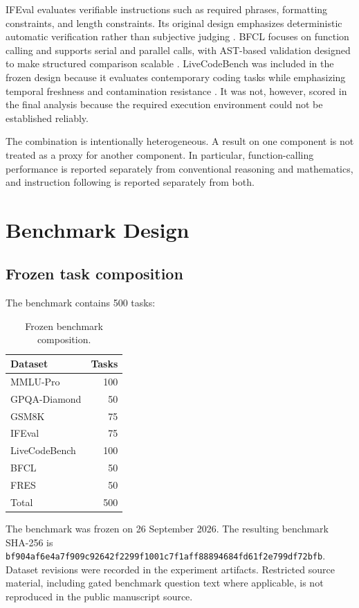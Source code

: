 \documentclass[11pt]{article}
\begin{document}
IFEval evaluates verifiable instructions such as required phrases, formatting constraints, and length constraints. Its original design emphasizes deterministic automatic verification rather than subjective judging \cite{zhou2023ifeval}. BFCL focuses on function calling and supports serial and parallel calls, with AST-based validation designed to make structured comparison scalable \cite{patil2025bfcl}. LiveCodeBench was included in the frozen design because it evaluates contemporary coding tasks while emphasizing temporal freshness and contamination resistance \cite{jain2024livecodebench}. It was not, however, scored in the final analysis because the required execution environment could not be established reliably.

The combination is intentionally heterogeneous. A result on one component is not treated as a proxy for another component. In particular, function-calling performance is reported separately from conventional reasoning and mathematics, and instruction following is reported separately from both.

\section{Benchmark Design}
\subsection{Frozen task composition}
The benchmark contains 500 tasks:

\begin{table}[t]
\centering
\caption{Frozen benchmark composition.}
\label{tab:composition}
\begin{tabular}{lr}
\toprule
Dataset & Tasks \\
\midrule
MMLU-Pro & 100 \\
GPQA-Diamond & 50 \\
GSM8K & 75 \\
IFEval & 75 \\
LiveCodeBench & 100 \\
BFCL & 50 \\
FRES & 50 \\
\midrule
Total & 500 \\
\bottomrule
\end{tabular}
\end{table}

The benchmark was frozen on 26 September 2026. The resulting benchmark SHA-256 is \texttt{bf904af6e4a7f909c92642f2299f1001c7f1aff88894684fd61f2e799df72bfb}. Dataset revisions were recorded in the experiment artifacts. Restricted source material, including gated benchmark question text where applicable, is not reproduced in the public manuscript source.
\end{document}
